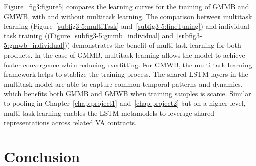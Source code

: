 Figure~\ref{fig3:figure5} compares the learning curves for the training of GMMB and GMWB, with and without multitask learning.
The comparison between multitask learning (Figure~\ref{subfig3-5:multiTask} and~\ref{subfig3-5:fineTuning}) and individual task training ((Figure~\ref{subfig3-5:gmmb_individual} and~\ref{subfig3-5:gmwb_individual})) demonstrates the benefit of multi-task learning for both products. 
In the case of GMMB, multitask learning allows the model to achieve faster convergence while reducing overfitting.
For GMWB, the multi-task learning framework helps to stablize the training process.
The shared LSTM layers in the multitask model are able to capture common temporal patterns and dynamics, which benefits both GMMB and GMWB when training samples is scarce.
Similar to pooling in Chapter~\ref{chap:project1} and~\ref{chap:project2} but on a higher level, multi-task learning enables the LSTM metamodels to leverage shared representations across related VA contracts.



\section{Conclusion} \label{sec3:conclusion}

